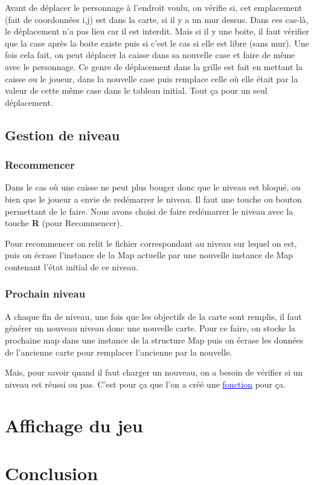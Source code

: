 \documentclass[french, 12pt]{article}
\begin{document}
       Avant de déplacer le personnage à l'endroit voulu, on vérifie si, cet emplacement (fait de coordonnées i,j) est dans la carte, si il y a un mur dessus. Dans ces cas-là, le déplacement n'a pas lieu car il est interdit. Mais si il y une boite, il faut vérifier que la case après la boite existe puis si c'est le cas si elle est libre (sans mur). Une fois cela fait, on peut déplacer la caisse dans sa nouvelle case et faire de même avec le personnage. Ce genre de déplacement dans la grille est fait en mettant la caisse ou le joueur, dans la nouvelle case puis remplace celle où elle était par la valeur de cette même case dans le tableau initial.
       Tout ça pour un seul déplacement.


   \subsection{Gestion de niveau}
       \subsubsection{Recommencer}
       Dans le cas où une caisse ne peut plus bouger donc que le niveau est bloqué, ou bien que le joueur a envie de redémarrer le niveau. Il faut une touche ou bouton permettant de le faire.
       Nous avons choisi de faire redémarrer le niveau avec la touche \textbf{R} (pour Recommencer).


       Pour recommencer on relit le fichier correspondant au niveau sur lequel on est, puis on écrase l'instance de la Map actuelle par une nouvelle instance de Map contenant l'état initial de ce niveau.


       \subsubsection{Prochain niveau}


       A chaque fin de niveau, une fois que les objectifs de la carte sont remplis, il faut générer un nouveau niveau donc une nouvelle carte.
       Pour ce faire, on stocke la prochaine map dans une instance de la structure Map puis on écrase les données de l'ancienne carte pour remplacer l'ancienne par la nouvelle.


       Mais, pour savoir quand il faut charger un nouveau, on a besoin de vérifier si un niveau est réussi ou pas. C'est pour ça que l'on a créé une \href{../doc/html/move_8h.html}{\textcolor{blue}{\underline{fonction}}} pour ça.




\section{Affichage du jeu}


\section{Conclusion}
\end{document}
